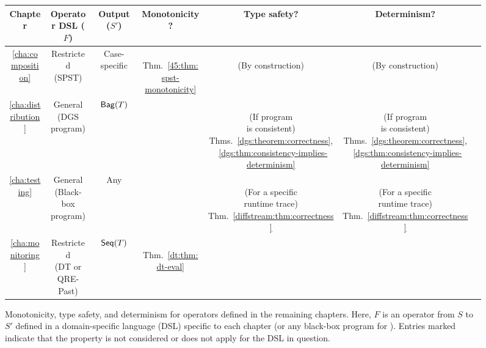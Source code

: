 \begin{figure}[t]
\centering
\footnotesize
\renewcommand{\arraystretch}{5}
\setlength{\tabcolsep}{4pt}
\begin{tabular}{ccccccc}
Chapter & Operator DSL ($F$) & Output ($S'$) & Monotonicity? & Type safety? & Determinism? \\
\hline
\ref{cha:composition}
  & \makecell{Restricted \\ (SPST)} & Case-specific
  & \makecell{\Yes{} \\ Thm.~\ref{45:thm:spst-monotonicity}} & \makecell{\Yes{} \\ (By construction)} & \makecell{\Yes{} \\ (By construction)} \\
\ref{cha:distribution}
  & \makecell{General \\ (DGS program)} & $\mathsf{Bag}({T})$
  & \Yes{} & \makecell{\Yes{} \\ (If program \\ is consistent) \\ Thms.~\ref{dgs:theorem:correctness},~\ref{dgs:thm:consistency-implies-determinism}} & \makecell{\Yes{} \\ (If program \\ is consistent) \\ Thms.~\ref{dgs:theorem:correctness},~\ref{dgs:thm:consistency-implies-determinism}} \\
\ref{cha:testing}
  & \makecell{General \\ (Black-box program)} & Any
  & \NA{} & \makecell{\Partial{} \\ (For a specific \\ runtime trace) \\ Thm.~\ref{diffstream:thm:correctness}} & \makecell{\Partial{} \\ (For a specific \\ runtime trace) \\ Thm.~\ref{diffstream:thm:correctness}} \\
\ref{cha:monitoring}
  & \makecell{Restricted \\ (DT or QRE-Past)} & $\mathsf{Seq}({T})$
  & \makecell{\Yes{} \\ Thm.~\ref{dt:thm:dt-eval}} & \NA{} & \Yes{} \\
\end{tabular}

\caption[Monotonicity, type safety, and determinism for the remaining chapters.]{Monotonicity, type safety, and determinism for operators defined in the remaining chapters. Here, $F$ is an operator from $S$ to $S'$ defined in a domain-specific language (DSL) specific to each chapter (or any black-box program for ). Entries marked \NA{} indicate that the property is not considered or does not apply for the DSL in question.}
\label{fig:operator-properties-chapter-table}
\end{figure}

